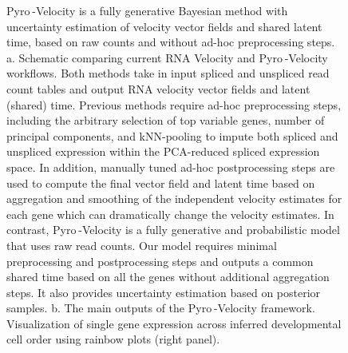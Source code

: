 \documentclass[
  sn-mathphys-num,
  lineno,
  twocolumn]{sn-jnl}
\begin{document}
\begin{figure}


\caption{\label{fig-model}Pyro -Velocity is a fully generative Bayesian
method with uncertainty estimation of velocity vector fields and shared
latent time, based on raw counts and without ad-hoc preprocessing steps.
a. Schematic comparing current RNA Velocity and Pyro -Velocity
workflows. Both methods take in input spliced and unspliced read count
tables and output RNA velocity vector fields and latent (shared) time.
Previous methods require ad-hoc preprocessing steps, including the
arbitrary selection of top variable genes, number of principal
components, and kNN-pooling to impute both spliced and unspliced
expression within the PCA-reduced spliced expression space. In addition,
manually tuned ad-hoc postprocessing steps are used to compute the final
vector field and latent time based on aggregation and smoothing of the
independent velocity estimates for each gene which can dramatically
change the velocity estimates. In contrast, Pyro -Velocity is a fully
generative and probabilistic model that uses raw read counts. Our model
requires minimal preprocessing and postprocessing steps and outputs a
common shared time based on all the genes without additional aggregation
steps. It also provides uncertainty estimation based on posterior
samples. b. The main outputs of the Pyro -Velocity framework.
Visualization of single gene expression across inferred developmental
cell order using rainbow plots (right panel).}

\end{figure}%
\end{document}
